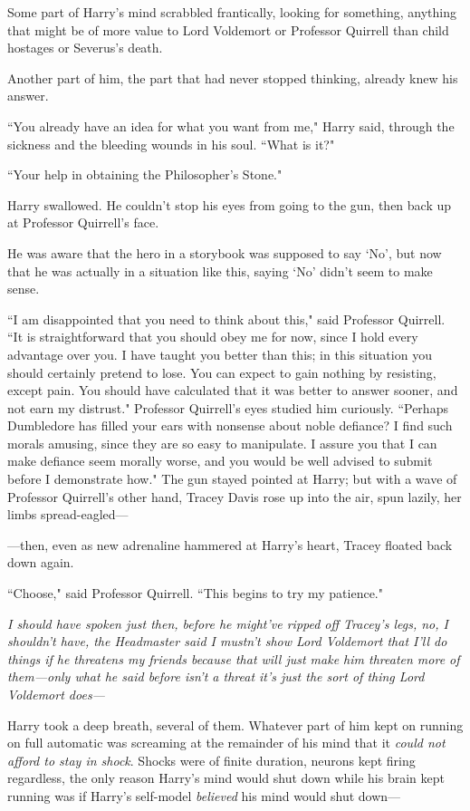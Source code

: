 Some part of Harry's mind scrabbled frantically, looking for something, anything that might be of more value to Lord Voldemort or Professor Quirrell than child hostages or Severus's death.

Another part of him, the part that had never stopped thinking, already knew his answer.

``You already have an idea for what you want from me," Harry said, through the sickness and the bleeding wounds in his soul. ``What is it?"

``Your help in obtaining the Philosopher's Stone."

Harry swallowed. He couldn't stop his eyes from going to the gun, then back up at Professor Quirrell's face.

He was aware that the hero in a storybook was supposed to say `No', but now that he was actually in a situation like this, saying `No' didn't seem to make sense.

``I am disappointed that you need to think about this," said Professor Quirrell. ``It is straightforward that you should obey me for now, since I hold every advantage over you. I have taught you better than this; in this situation you should certainly pretend to lose. You can expect to gain nothing by resisting, except pain. You should have calculated that it was better to answer sooner, and not earn my distrust." Professor Quirrell's eyes studied him curiously. ``Perhaps Dumbledore has filled your ears with nonsense about noble defiance? I find such morals amusing, since they are so easy to manipulate. I assure you that I can make defiance seem morally worse, and you would be well advised to submit before I demonstrate how." The gun stayed pointed at Harry; but with a wave of Professor Quirrell's other hand, Tracey Davis rose up into the air, spun lazily, her limbs spread-eagled—

—then, even as new adrenaline hammered at Harry's heart, Tracey floated back down again.

``Choose," said Professor Quirrell. ``This begins to try my patience."

\emph{I should have spoken just then, before he might've ripped off Tracey's legs, no, I shouldn't have, the Headmaster said I mustn't show Lord Voldemort that I'll do things if he threatens my friends because that will just make him threaten more of them—only what he said before isn't a \emph{threat} it's just the sort of thing Lord Voldemort \emph{does}—}

Harry took a deep breath, several of them. Whatever part of him kept on running on full automatic was screaming at the remainder of his mind that it \emph{could not afford to stay in shock}. Shocks were of finite duration, neurons kept firing regardless, the only reason Harry's mind would shut down while his brain kept running was if Harry's self-model \emph{believed} his mind would shut down—

